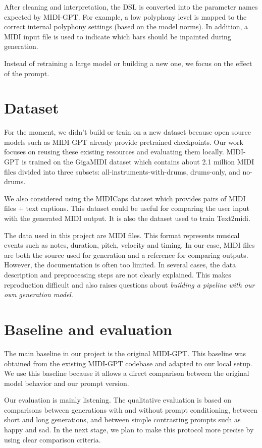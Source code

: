 \documentclass[11pt]{article}
\begin{document}
After cleaning and interpretation, the DSL is converted into the parameter names expected by MIDI-GPT. For example, a low polyphony level is mapped to the correct internal polyphony settings (based on the model norms). In addition, a MIDI input file is used to indicate which bars should be inpainted during generation.

Instead of retraining a large model or building a new one, we focus on the effect of the prompt.

\section{Dataset}

For the moment, we didn't build or train on a new dataset because open source models such as MIDI-GPT already provide pretrained checkpoints. Our work focuses on reusing these existing resources and evaluating them locally. MIDI-GPT is trained on the GigaMIDI dataset which contains about 2.1 million MIDI files divided into three subsets: all-instruments-with-drums, drums-only, and no-drums.

We also considered using the MIDICaps dataset which provides pairs of MIDI files + text captions. This dataset could be useful for comparing the user input with the generated MIDI output. It is also the dataset used to train Text2midi.

The data used in this project are MIDI files. This format represents musical events such as notes, duration, pitch, velocity and timing. In our case, MIDI files are both the source used for generation and a reference for comparing outputs. However, the documentation is often too limited. In several cases, the data description and preprocessing steps are not clearly explained. This makes reproduction difficult and also raises questions about \textit{building a pipeline with our own generation model}.

\section{Baseline and evaluation}

The main baseline in our project is the original MIDI-GPT. This baseline was obtained from the existing MIDI-GPT codebase and adapted to our local setup. We use this baseline because it allows a direct comparison between the original model behavior and our prompt version. 

Our evaluation is mainly listening. The qualitative evaluation is based on comparisons between generations with and without prompt conditioning, between short and long generations, and between simple contrasting prompts such as happy and sad. In the next stage, we plan to make this protocol more precise by using clear comparison criteria.
\end{document}
